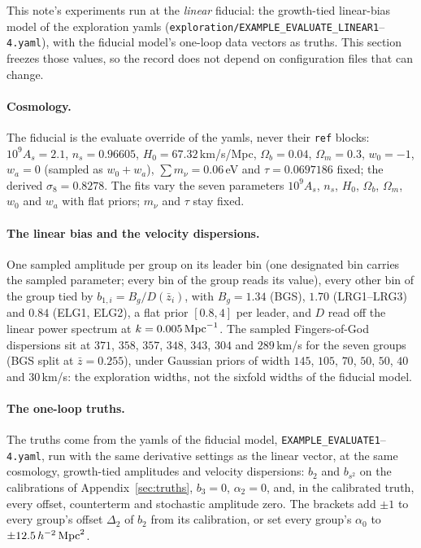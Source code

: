 \documentclass[11pt]{article}
\begin{document}
This note's experiments run at the \emph{linear} fiducial: the
growth-tied linear-bias model of the exploration yamls
(\texttt{exploration/EXAMPLE\_EVALUATE\_LINEAR1}--\texttt{4.yaml}),
with the fiducial model's one-loop data vectors as truths.  This section freezes those
values, so the record does not depend on configuration files that can
change.

\paragraph{Cosmology.}
The fiducial is the evaluate override of the yamls, never their
\texttt{ref} blocks: $10^9 A_s = 2.1$, $n_s = 0.96605$,
$H_0 = 67.32$\,km/s/Mpc, $\Omega_b = 0.04$, $\Omega_m = 0.3$,
$w_0 = -1$, $w_a = 0$ (sampled as $w_0 + w_a$),
$\sum m_\nu = 0.06$\,eV and $\tau = 0.0697186$ fixed; the derived
$\sigma_8 = 0.8278$.  The fits vary the seven parameters $10^9 A_s$,
$n_s$, $H_0$, $\Omega_b$, $\Omega_m$, $w_0$ and $w_a$ with flat
priors; $m_\nu$ and $\tau$ stay fixed.

\paragraph{The linear bias and the velocity dispersions.}
One sampled amplitude per group on its leader bin (one designated bin
carries the sampled parameter; every bin of the group reads its
value), every other bin of
the group tied by $b_{1,i} = B_g/D(\bar{z}_i)$, with $B_g = 1.34$
(BGS), $1.70$ (LRG1--LRG3) and $0.84$ (ELG1, ELG2), a flat prior
$[0.8, 4]$ per leader, and $D$ read off the linear power spectrum at
$k = 0.005\,{\rm Mpc}^{-1}$.  The sampled Fingers-of-God dispersions
sit at $371$, $358$, $357$, $348$, $343$, $304$ and $289$\,km/s for
the seven groups (BGS split at $\bar{z} = 0.255$), under Gaussian
priors of width $145$, $105$, $70$, $50$, $50$, $40$ and $30$\,km/s:
the exploration widths, not the sixfold widths of the fiducial
model.

\paragraph{The one-loop truths.}
The truths come from the yamls of the fiducial model,
\texttt{EXAMPLE\_EVALUATE1}--\texttt{4.yaml}, run with the same
derivative settings as the linear vector, at the same cosmology,
growth-tied
amplitudes and velocity dispersions: $b_2$ and $b_{s^2}$ on the
calibrations of Appendix~\ref{sec:truths}, $b_3 = 0$, $\alpha_2 = 0$,
and, in the calibrated truth, every offset, counterterm and stochastic
amplitude zero.  The brackets add $\pm1$ to every group's offset
$\Delta_2$ of $b_2$ from its calibration, or set every group's
$\alpha_0$ to $\pm12.5\,h^{-2}\,{\rm Mpc}^2$.
\end{document}
